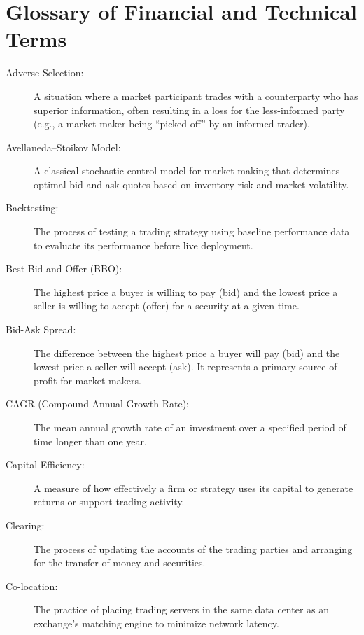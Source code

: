 \chapter*{Glossary of Financial and Technical Terms}

\begin{description}
    \item[Adverse Selection:] A situation where a market participant trades with a counterparty who has superior information, often resulting in a loss for the less-informed party (e.g., a market maker being ``picked off'' by an informed trader).
    
    \item[Avellaneda--Stoikov Model:] A classical stochastic control model for market making that determines optimal bid and ask quotes based on inventory risk and market volatility.
    
    \item[Backtesting:] The process of testing a trading strategy using baseline performance data to evaluate its performance before live deployment.
    
    \item[Best Bid and Offer (BBO):] The highest price a buyer is willing to pay (bid) and the lowest price a seller is willing to accept (offer) for a security at a given time.
    
    \item[Bid-Ask Spread:] The difference between the highest price a buyer will pay (bid) and the lowest price a seller will accept (ask). It represents a primary source of profit for market makers.
    
    \item[CAGR (Compound Annual Growth Rate):] The mean annual growth rate of an investment over a specified period of time longer than one year.
    
    \item[Capital Efficiency:] A measure of how effectively a firm or strategy uses its capital to generate returns or support trading activity.
    
    \item[Clearing:] The process of updating the accounts of the trading parties and arranging for the transfer of money and securities.
    
    \item[Co-location:] The practice of placing trading servers in the same data center as an exchange's matching engine to minimize network latency.
    

\end{description}

